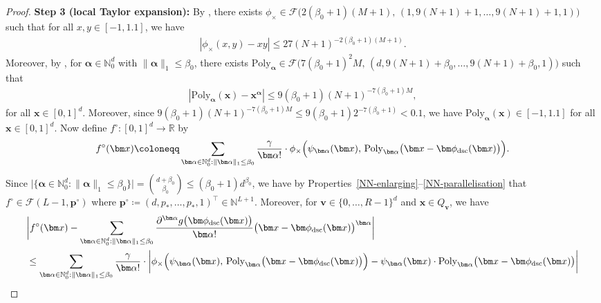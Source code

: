 \documentclass[12pt]{article}
\begin{document}
\begin{proof}
    \medskip \textbf{Step 3 (local Taylor expansion):} By \citet[Lemma~4.2]{lu2021deep}, there exists $\phi_{\times} \in \mathcal{F}\bigl(2(\beta_0+1)(M+1),\, (1,9(N+1)+1,\ldots,9(N+1)+1,1)\bigr)$ such that for all $x,y\in[-1,1.1]$, we have
    \begin{align}
        |\phi_{\times}(x,y) - xy| \leq 27(N+1)^{-2(\beta_0+1)(M+1)}. \label{eq:phi_times-property}
    \end{align}
    Moreover, by \citet[Proposition~4.1]{lu2021deep}, for $\bm\alpha\in\mathbb{N}_0^d$ with $\|\bm\alpha\|_1 \leq \beta_0$, there exists $\mathrm{Poly}_{\bm\alpha} \in \mathcal{F}\bigl(7(\beta_0+1)^2M,\, (d,9(N+1)+\beta_0,\ldots,9(N+1)+\beta_0,1)\bigr)$ such that
    \begin{align}
        |\mathrm{Poly}_{\bm\alpha}(\bm x) - \bm x^{\bm\alpha}| \leq 9(\beta_0+1)(N+1)^{-7(\beta_0+1)M}, \label{eq:poly_alpha-property}
    \end{align}
    for all $\bm x \in [0,1]^d$.
    Moreover, since $9(\beta_0+1)(N+1)^{-7(\beta_0+1)M} \leq 9(\beta_0+1)2^{-7(\beta_0+1)} < 0.1$, we have $\mathrm{Poly}_{\bm\alpha}(\bm x) \in [-1,1.1]$ for all $\bm x\in[0,1]^d$. Now define $f^\circ:[0,1]^d \rightarrow \mathbb{R}$ by  
    \begin{align*}
        f^\circ(\bm x) \coloneqq \sum_{\bm\alpha \in \mathbb{N}_0^d : \|\bm\alpha\|_1 \leq \beta_0} \frac{\gamma}{\bm\alpha!} \cdot \phi_{\times} \Bigl(\psi_{\bm\alpha}(\bm x),\, \mathrm{Poly}_{\bm\alpha}\bigl(\bm x - \bm\phi_{\mathrm{dsc}}(\bm x) \bigr)\Bigr).
    \end{align*}
    Since $\bigl|\{\bm\alpha \in \mathbb{N}_0^d : \|\bm\alpha\|_1 \leq \beta_0\}\bigr| = \binom{d+\beta_0}{\beta_0} \leq (\beta_0+1)d^{\beta_0}$, we have by Properties~\ref{NN-enlarging}--\ref{NN-parallelisation} that $f^\circ \in \mathcal{F}(L-1,\bm p^\circ)$ where $\bm p^\circ \coloneqq (d,p_*,\ldots,p_*,1)^\top \in \mathbb{N}^{L+1}$. Moreover, for $\bm v \in \{0,\ldots,R-1\}^d$ and $\bm x \in Q_{\bm v}$, we have
    \begin{align}
        &\biggl|f^\circ(\bm x) - \sum_{\bm\alpha \in \mathbb{N}_0^d : \|\bm\alpha\|_1 \leq \beta_0} \frac{\partial^{\bm\alpha}g\bigl(\bm\phi_{\mathrm{dsc}}(\bm x)\bigr)}{\bm\alpha!} \bigl(\bm x - \bm\phi_{\mathrm{dsc}}(\bm x)\bigr)^{\bm\alpha} \biggr| \nonumber\\
        &\leq \sum_{\bm\alpha \in \mathbb{N}_0^d : \|\bm\alpha\|_1 \leq \beta_0} \frac{\gamma}{\bm\alpha!} \cdot \biggl| \phi_{\times} \Bigl(\psi_{\bm\alpha}(\bm x),\, \mathrm{Poly}_{\bm\alpha}\bigl(\bm x - \bm\phi_{\mathrm{dsc}}(\bm x) \bigr)\Bigr) - \psi_{\bm\alpha}(\bm x) \cdot \mathrm{Poly}_{\bm\alpha}\bigl(\bm x - \bm\phi_{\mathrm{dsc}}(\bm x) \bigr) \biggr| \nonumber\\

\end{align}
\end{proof}
\end{document}
